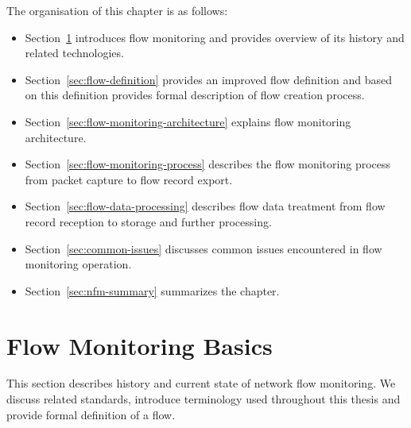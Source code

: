 \begin{chapintro}
The organisation of this chapter is as follows:
\begin{itemize}
  \item Section~\ref{sec:flow-monitoring-basics} introduces flow monitoring and provides overview of its history and related technologies.
  \item Section~\ref{sec:flow-definition} provides an improved flow definition and based on this definition provides formal description of flow creation process.
  \item Section~\ref{sec:flow-monitoring-architecture} explains flow monitoring architecture.
  \item Section~\ref{sec:flow-monitoring-process} describes the flow monitoring process from packet capture to flow record export.
  \item Section~\ref{sec:flow-data-processing} describes flow data treatment from flow record reception to storage and further processing.
  \item Section~\ref{sec:common-issues} discusses common issues encountered in flow monitoring operation.
  \item Section~\ref{sec:nfm-summary} summarizes the chapter.
\end{itemize}

\end{chapintro}


\newpage

\section{Flow Monitoring Basics}\label{sec:flow-monitoring-basics}

This section describes history and current state of network flow monitoring. We discuss related standards, introduce terminology used throughout this thesis and provide formal definition of a flow. 

